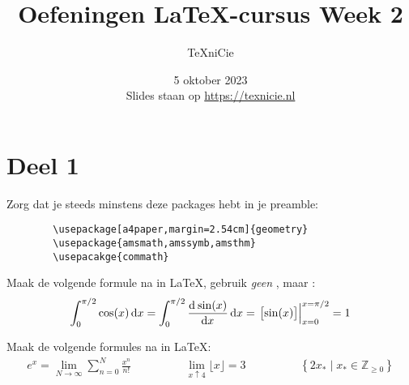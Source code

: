 \documentclass[a4paper]{article}
\title{\vspace{-65pt} Oefeningen \LaTeX-cursus Week 2}
\author{\TeX niCie}
\date{5 oktober 2023\\{\small\texorpdfstring{Slides staan op \url{https://texnicie.nl}}{}}}
\begin{document}
\maketitle


\section{Deel 1}
Zorg dat je steeds minstens deze packages hebt in je preamble:
\begin{verbatim}
        \usepackage[a4paper,margin=2.54cm]{geometry}
        \usepackage{amsmath,amssymb,amsthm}
        \usepacakge{commath}
    \end{verbatim}
\bigskip


\begin{exercise}
    Maak de volgende formule na in \LaTeX, gebruik \emph{geen} \texttt{\frac}, maar \texttt{\dod}:
    \begin{align*}
        \int_{0}^{\pi/2}\cos(x)\dif x
        =
        \int_{0}^{\pi/2}\dod{\sin(x)}{x}\dif x
        =
        \left.\left[\sin(x)\right]\right|_{x=0}^{x=\pi/2}
        =
        1
    \end{align*}
\end{exercise}

\begin{exercise}
    Maak de volgende formules na in \LaTeX:
    \begin{align*}
        e^{x} = \lim_{N\to\infty}\sum_{n=0}^{N}\frac{x^n}{n!}
        \hspace{2cm}
        \lim_{x\uparrow 4}\lfloor x\rfloor = 3
        \hspace{2cm}
        \left\{2x_{*}\mid x_{*}\in \mathbb{Z}_{\geq 0}\right\}
    \end{align*}
\end{exercise}





\end{document}
